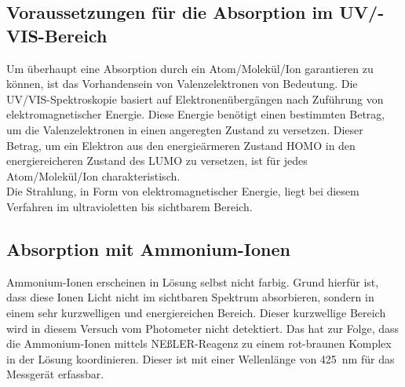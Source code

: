\subsection{Voraussetzungen für die Absorption im UV/-VIS-Bereich}
Um überhaupt eine Absorption durch ein Atom/Molekül/Ion garantieren zu können, ist das Vorhandensein von Valenzelektronen von Bedeutung. Die UV/VIS-Spektroskopie basiert auf Elektronenübergängen nach Zuführung von elektromagnetischer Energie. Diese Energie benötigt einen bestimmten Betrag, um die Valenzelektronen in einen angeregten Zustand zu versetzen. Dieser Betrag, um ein Elektron aus den energieärmeren Zustand HOMO in den energiereicheren Zustand des LUMO zu versetzen, ist für jedes Atom/Molekül/Ion charakteristisch. \\
Die Strahlung, in Form von elektromagnetischer Energie, liegt bei diesem Verfahren im ultravioletten bis sichtbarem Bereich.

\subsection{Absorption mit Ammonium-Ionen}
Ammonium-Ionen erscheinen in Lösung selbst nicht farbig. Grund hierfür ist, dass diese Ionen Licht nicht im sichtbaren Spektrum absorbieren, sondern in einem sehr kurzwelligen und energiereichen Bereich. Dieser kurzwellige Bereich wird in diesem Versuch vom Photometer nicht detektiert. Das hat zur Folge, dass die Ammonium-Ionen mittels NEßLER-Reagenz zu einem rot-braunen Komplex in der Lösung koordinieren. Dieser ist mit einer Wellenlänge von \SI{425}{\nano \meter} für das Messgerät erfassbar.

